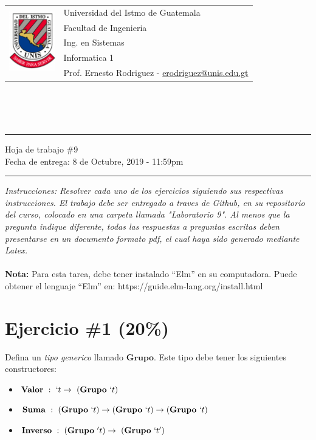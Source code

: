 \documentclass{article}
\newcommand{\horrule}[1]{\rule{\linewidth}{#1}}
\begin{document}
\begin{tabular}{l l}
\multirow{5}{*}{\includegraphics[width=2cm]{../../recursos/logo.png}}
 & Universidad del Istmo de Guatemala \\
 & Facultad de Ingenieria \\
 & Ing. en Sistemas \\
 & Informatica 1 \\
 & Prof. Ernesto Rodriguez - \href{mailto:erodriguez@unis.edu.gt}{erodriguez@unis.edu.gt} \\
\end{tabular}
\\\\\\

\begin{center}
        \horrule{0.5pt}
        \huge{Hoja de trabajo \#9} \\
        \large{Fecha de entrega: 8 de Octubre, 2019 - 11:59pm} \\
        \horrule{1pt}
\end{center}

\emph{Instrucciones: Resolver cada uno de los ejercicios siguiendo sus respectivas
instrucciones. El trabajo debe ser entregado a traves de Github, en su repositorio del curso, colocado en una
carpeta llamada "Laboratorio 9". Al menos que la pregunta indique diferente, todas las
respuestas a preguntas escritas deben presentarse en un documento formato pdf, el cual
haya sido generado mediante Latex. }\\\\

{\bf Nota: } Para esta tarea, debe tener instalado ``Elm'' en su computadora. Puede obtener
el lenguaje ``Elm'' en: https://guide.elm-lang.org/install.html

\section*{Ejercicio \#1 (20\%)}

Defina un \emph{tipo generico} llamado $\mathbf{Grupo}$. Este tipo debe tener
los siguientes constructores:
\begin{itemize}
        \item $\mathbf{Valor}\ :\ `t\rightarrow\ (\mathbf{Grupo}\ `t)$
        \item $\mathbf{Suma}\ :\ (\mathbf{Grupo}\ `t)\rightarrow(\mathbf{Grupo}\ `t)\rightarrow(\mathbf{Grupo}\ `t)$
        \item $\mathbf{Inverso}\ :\ (\mathbf{Grupo}\ 't) \rightarrow\ (\mathbf{Grupo}\ `t') $
\end{itemize}
\end{document}
